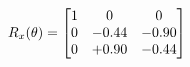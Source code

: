 \documentclass[preview]{standalone}
\begin{document}
\begin{align*}
\special{dvisvgm:raw <g id='unique000'>}R_{x}(\theta) = \begin{bmatrix}1 & 0 & 0 \\0 & -0.44 & -0.90 \\0 & +0.90 & -0.44\end{bmatrix}\special{dvisvgm:raw </g>}
\end{align*}
\end{document}
